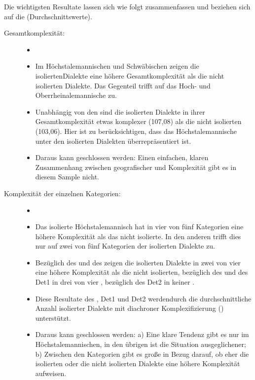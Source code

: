 Die wichtigsten Resultate lassen sich wie folgt zusammenfassen und beziehen sich auf die  (Durchschnittswerte).

\begin{description}
 \item[Gesamtkomplexität:]
 
\begin{itemize}
\item[]
\item
Im Höchstalemannischen und Schwäbischen zeigen die isolierten\linebreak Dialekte eine höhere Gesamtkomplexität als die nicht isolierten Dialekte. Das Gegenteil trifft auf das Hoch- und Oberrheinalemannische zu.
\item
Unabhängig von den  sind die isolierten Dialekte in ihrer Gesamtkomplexität etwas komplexer (107,08) als die nicht isolierten (103,06). Hier ist zu berücksichtigen, dass das Höchstalemannische unter den isolierten Dialekten überrepräsentiert ist.
\item
Daraus kann geschlossen werden: Einen einfachen, klaren Zusammenhang zwischen geografischer  und Komplexität gibt es in diesem Sample nicht.
\end{itemize}

\item[Komplexität der einzelnen Kategorien:]
\begin{itemize}
\item[]
\item
Das isolierte Höchstalemannisch hat in vier von fünf Kategorien eine höhere Komplexität als das nicht isolierte. In den anderen  trifft dies nur auf zwei von fünf Kategorien der isolierten Dialekte zu.
\item
Bezüglich des  und des  zeigen die isolierten Dialekte in zwei von vier  eine höhere Komplexität als die nicht isolierten, bezüglich des  und des Det1 in drei von vier , bezüglich des Det2 in keiner .
\item
Diese Resultate des , Det1 und Det2 werden\linebreak durch die durchschnittliche Anzahl isolierter Dialekte mit diachroner Komplexifizierung () unterstützt.
\item
Daraus kann geschlossen werden: a) Eine klare Tendenz gibt es nur im Höchstalemannischen, in den übrigen  ist die Situation ausgeglichener; b) Zwischen den Kategorien gibt es große  in Bezug darauf, ob eher die isolierten oder die nicht isolierten Dialekte eine höhere Komplexität aufweisen.
\end{itemize}
\end{description}

